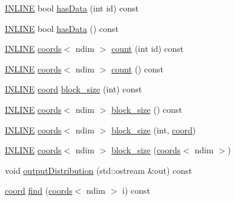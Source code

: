 \begin{DoxyCompactItemize}
\item 
\hyperlink{common_8hpp_a2eb6f9e0395b47b8d5e3eeae4fe0c116}{I\+N\+L\+I\+NE} bool \hyperlink{classshark_1_1ndim_1_1_domain_a9ab20d9ecd3ca2c046ee253a30ab843f}{has\+Data} (int id) const
\item 
\hyperlink{common_8hpp_a2eb6f9e0395b47b8d5e3eeae4fe0c116}{I\+N\+L\+I\+NE} bool \hyperlink{classshark_1_1ndim_1_1_domain_a6c4491743273ca6ab3e72f5ca3f03912}{has\+Data} () const
\item 
\hyperlink{common_8hpp_a2eb6f9e0395b47b8d5e3eeae4fe0c116}{I\+N\+L\+I\+NE} \hyperlink{structshark_1_1ndim_1_1coords}{coords}$<$ ndim $>$ \hyperlink{classshark_1_1ndim_1_1_domain_a2539860488c03f96be5fddd54f6f99c0}{count} (int id) const
\item 
\hyperlink{common_8hpp_a2eb6f9e0395b47b8d5e3eeae4fe0c116}{I\+N\+L\+I\+NE} \hyperlink{structshark_1_1ndim_1_1coords}{coords}$<$ ndim $>$ \hyperlink{classshark_1_1ndim_1_1_domain_ae35ca88c98731659785066a92c5def91}{count} () const
\item 
\hyperlink{common_8hpp_a2eb6f9e0395b47b8d5e3eeae4fe0c116}{I\+N\+L\+I\+NE} \hyperlink{namespaceshark_a767a92d5dd82cb82266473bff42fa6d9}{coord} \hyperlink{classshark_1_1ndim_1_1_domain_a494512abfa4490fc22f073e111028d96}{block\+\_\+size} (int) const
\item 
\hyperlink{common_8hpp_a2eb6f9e0395b47b8d5e3eeae4fe0c116}{I\+N\+L\+I\+NE} \hyperlink{structshark_1_1ndim_1_1coords}{coords}$<$ ndim $>$ \hyperlink{classshark_1_1ndim_1_1_domain_a0bdb8748f3d0a8116429939668d5f0d7}{block\+\_\+size} () const
\item 
\hyperlink{common_8hpp_a2eb6f9e0395b47b8d5e3eeae4fe0c116}{I\+N\+L\+I\+NE} \hyperlink{structshark_1_1ndim_1_1coords}{coords}$<$ ndim $>$ \hyperlink{classshark_1_1ndim_1_1_domain_a13bdc44128a355f84ecb7c057f4a735e}{block\+\_\+size} (int, \hyperlink{namespaceshark_a767a92d5dd82cb82266473bff42fa6d9}{coord})
\item 
\hyperlink{common_8hpp_a2eb6f9e0395b47b8d5e3eeae4fe0c116}{I\+N\+L\+I\+NE} \hyperlink{structshark_1_1ndim_1_1coords}{coords}$<$ ndim $>$ \hyperlink{classshark_1_1ndim_1_1_domain_ac30400283240054ed6b01289a5b21b7f}{block\+\_\+size} (\hyperlink{structshark_1_1ndim_1_1coords}{coords}$<$ ndim $>$)
\item 
void \hyperlink{classshark_1_1ndim_1_1_domain_ad641aa7b49cf05bb9d231af978f3c1cc}{output\+Distribution} (std\+::ostream \&out) const
\item 
\hyperlink{namespaceshark_a767a92d5dd82cb82266473bff42fa6d9}{coord} \hyperlink{classshark_1_1ndim_1_1_domain_a027c9dbe5aa9fa2fd110c6fb4c62450f}{find} (\hyperlink{structshark_1_1ndim_1_1coords}{coords}$<$ ndim $>$ i) const

\end{DoxyCompactItemize}
